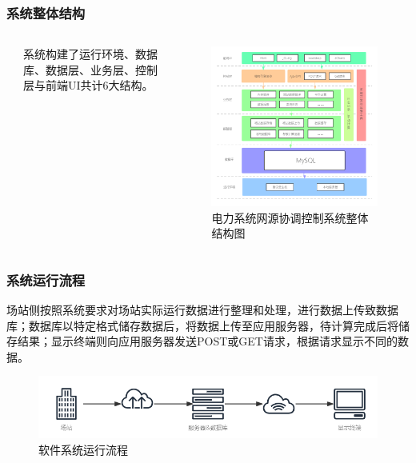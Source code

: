 \documentclass[aspectratio=169, 10pt, utf8, mathserif]{beamer}
\begin{document}
		\begin{frame}
		\frametitle{系统整体结构}
		
		\begin{columns}
			\begin{column}{.1\linewidth}
			
			\end{column}
			\begin{column}{.3\linewidth}
			系统构建了运行环境、数据库、数据层、业务层、控制层与前端UI共计6大结构。
			\end{column}
			
			\begin{column}{.6\linewidth}
					\begin{figure}[H]
					\centering
					\includegraphics[width=0.65\linewidth]{pic/系统框架结构}
					\caption{电力系统网源协调控制系统整体结构图}
					\label{电力系统网源协调控制系统整体结构图}
				\end{figure}
			\end{column}
		\end{columns}
	\end{frame}

	\begin{frame}
		\frametitle{系统运行流程}
		\zihao{3}
		场站侧按照系统要求对场站实际运行数据进行整理和处理，进行数据上传致数据库；数据库以特定格式储存数据后，将数据上传至应用服务器，待计算完成后将储存结果；显示终端则向应用服务器发送POST或GET请求，根据请求显示不同的数据。
		\begin{figure}[H]
			\centering
			\includegraphics[width=0.7\linewidth]{pic/软件系统示意图}
			\caption{软件系统运行流程}
			\label{软件系统运行流程}
		\end{figure}
	\end{frame}
	
\end{document}
